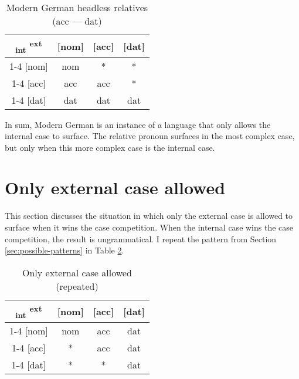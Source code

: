 \begin{table}[ht]
  \center
  \caption{Modern German headless relatives (\ac{acc} --- \ac{dat})}
  \begin{tabular}{c|c|c|c}
    \toprule
    \textsubscript{\ac{int}} \textsuperscript{\ac{ext}}
           & [\ac{nom}]
           & [\ac{acc}]
           & [\ac{dat}]
           \\ \cmidrule{1-4}
       [\ac{nom}]
           & \ac{nom}
           & *
           & *
           \\ \cmidrule{1-4}
       [\ac{acc}]
           & \ac{acc}
           & \ac{acc}
           & \cellcolor{DG}*
           \\ \cmidrule{1-4}
       [\ac{dat}]
           & \ac{dat}
           & \cellcolor{LG}\ac{dat}
           & \ac{dat}
           \\
     \bottomrule
  \end{tabular}
    \label{tbl:case-competition-mg-acc-dat}
\end{table}

In sum, Modern German is an instance of a language that only allows the internal case to surface. The relative pronoun surfaces in the most complex case, but only when this more complex case is the internal case.


\section{Only external case allowed}\label{sec:pattern-iii}

This section discusses the situation in which only the external case is allowed to surface when it wins the case competition. When the internal case wins the case competition, the result is ungrammatical. I repeat the pattern from Section \ref{sec:possible-patterns} in Table \ref{tbl:case-competition-only-ext-repeated}.

\begin{table}[ht]
  \center
  \caption{Only external case allowed (repeated)}
  \begin{tabular}{c|c|c|c}
    \toprule
    \textsubscript{\ac{int}} \textsuperscript{\ac{ext}}
           & [\ac{nom}]
           & [\ac{acc}]
           & [\ac{dat}]
           \\ \cmidrule{1-4}
       [\ac{nom}]
           & \ac{nom}
           & \ac{acc}
           & \ac{dat}
           \\ \cmidrule{1-4}
       [\ac{acc}]
           & *
           & \ac{acc}
           & \ac{dat}
           \\ \cmidrule{1-4}
       [\ac{dat}]
           & *
           & *
           & \ac{dat}
           \\
     \bottomrule
  \end{tabular}
    \label{tbl:case-competition-only-ext-repeated}
\end{table}

